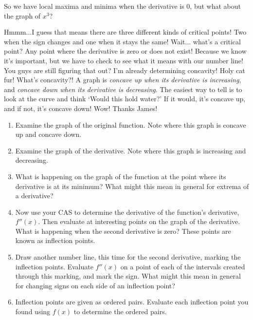 \documentclass{ximera}
\begin{document}
\begin{enumerate}
\begin{dialogue}
 So we have local maxima and minima when the derivative is 0, but what about the graph of $x^3$? 
\end{dialogue}
\begin{center}
\end{center}
\begin{dialogue}
 Hmmm...I guess that means there are three different kinds of critical points! Two when the sign changes and one when it stays the same!
 Wait... what's a critical point?
 Any point where the derivative is zero or does not exist! Because we know it's important, but we have to check to see what it means with our number line!
 You guys are still figuring that out? I'm already determining concavity!
 Holy cat fur! What's concavity?!
 A graph is \textit{concave up when its derivative is increasing}, and \textit{concave down when its derivative is decreasing}. The easiest way to tell is to look at the curve and think `Would this hold water?' If it would, it's concave up, and if not, it's concave down!
 Wow! Thanks James!
\end{dialogue}
\begin{enumerate}
\item{Examine the graph of the original function. Note where this graph is concave up and concave down.}
\item{Examine the graph of the derivative. Note where this graph is increasing and decreasing.}
\item{What is happening on the graph of the function at the point where its derivative is at its minimum? What might this mean in general for extrema of a derivative?}
\item{Now use your CAS to determine the derivative of the function's derivative, $f''(x)$. Then evaluate at interesting points on the graph of the derivative. What is happening when the second derivative is zero? These points are known as inflection points.}
\item{Draw another number line, this time for the second derivative, marking the inflection points. Evaluate $f''(x)$ on a point of each of the intervals created through this marking, and mark the sign. What might this mean in general for changing signs on each side of an inflection point?}
\item{Inflection points are given as ordered pairs. Evaluate each inflection point you found using $f(x)$ to determine the ordered pairs.}
\end{enumerate}
\end{enumerate}
\end{document}
